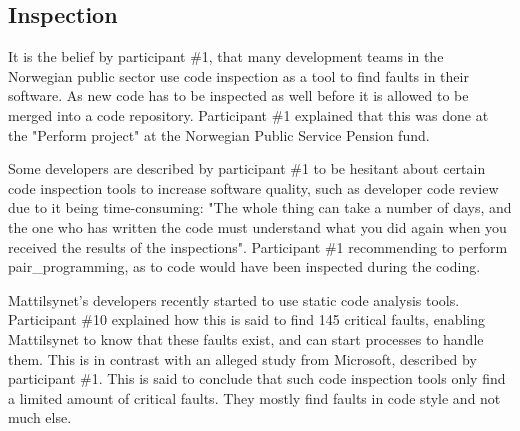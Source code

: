 \subsection{Inspection} \label{sec:inspection}
It is the belief by participant \#1, that many development teams in the Norwegian public sector use code inspection as a tool to find faults in their software. As new code has to be inspected as well before it is allowed to be merged into a code repository. Participant \#1 explained that this was done at the "Perform project" at the Norwegian Public Service Pension fund.



Some developers are described by participant \#1 to be hesitant about certain code inspection tools to increase software quality, such as developer code review due to it being time-consuming: "The whole thing can take a number of days, and the one who has written the code must understand what you did again when you received the results of the inspections". Participant \#1 recommending to perform \gls{pair_programming}, as to code would have been inspected during the coding.


Mattilsynet's developers recently started to use static code analysis tools. Participant \#10 explained how this is said to find 145 critical faults, enabling Mattilsynet to know that these faults exist, and can start processes to handle them. This is in contrast with an alleged study from Microsoft, described by participant \#1. This is said to conclude that such code inspection tools only find a limited amount of critical faults. They mostly find faults in code style and not much else.

